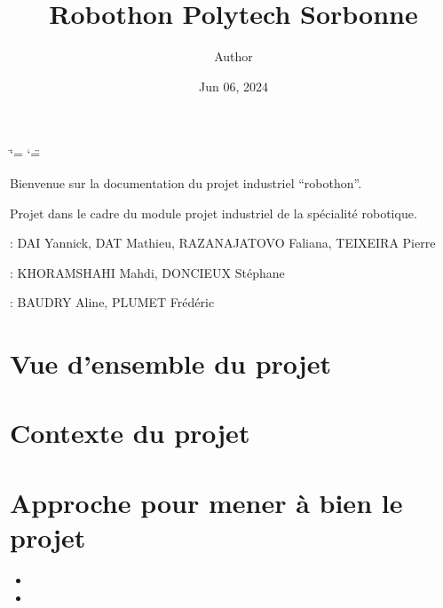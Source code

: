\documentclass[letterpaper,10pt,english]{sphinxmanual}
\title{Robothon \sphinxhyphen{} Polytech Sorbonne}
\date{Jun 06, 2024}
\author{Author}
\begin{document}
\ifdefined\shorthandoff
  \ifnum\catcode`\=\string=\active\shorthandoff{=}\fi
  \ifnum\catcode`\"=\active{}\fi
\fi

\pagestyle{empty}
\sphinxmaketitle
\pagestyle{plain}
\sphinxtableofcontents
\pagestyle{normal}
\label{\detokenize{index::doc}}


\sphinxAtStartPar
Bienvenue sur la documentation du projet industriel “robothon”.

\sphinxAtStartPar
Projet dans le cadre du module projet industriel de la spécialité robotique.

\sphinxAtStartPar
{} : DAI Yannick, DAT Mathieu, RAZANAJATOVO Faliana, TEIXEIRA Pierre

\sphinxAtStartPar
{} : KHORAMSHAHI Mahdi, DONCIEUX Stéphane

\sphinxAtStartPar
{} : BAUDRY Aline, PLUMET Frédéric

\sphinxstepscope


\chapter{Vue d’ensemble du projet}
\label{\detokenize{vue-ensemble:vue-d-ensemble-du-projet}}\label{\detokenize{vue-ensemble::doc}}


\sphinxstepscope


\chapter{Contexte du projet}
\label{\detokenize{contexte:contexte-du-projet}}\label{\detokenize{contexte::doc}}














\sphinxstepscope


\chapter{Approche pour mener à bien le projet}
\label{\detokenize{approche:approche-pour-mener-a-bien-le-projet}}\label{\detokenize{approche::doc}}
\sphinxAtStartPar
{}
\begin{itemize}
\item {} 
\sphinxAtStartPar
{}

\item {} 
\sphinxAtStartPar
{}

\end{itemize}
\end{document}
